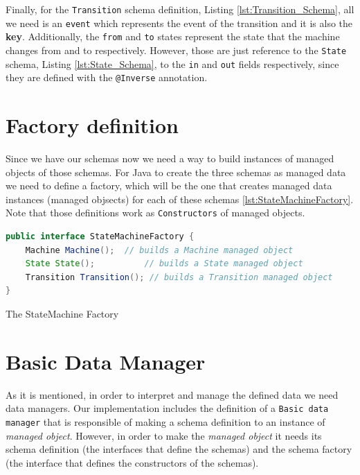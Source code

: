 Finally, for the \texttt{Transition} schema definition, Listing \ref{lst:Transition_Schema}, all we need is an \texttt{event} which represents the event of the transition and it is also the \textbf{key}.
Additionally, the \texttt{from} and \texttt{to} states represent the state that the machine changes from and to respectively.
However, those are just reference to the \texttt{State} schema, Listing \ref{lst:State_Schema}, to the \texttt{in} and \texttt{out} fields respectively, since they are defined with the \texttt{@Inverse} annotation.

\section{Factory definition}
Since we have our schemas now we need a way to build instances of managed objects of those schemas. 
For Java to create the three schemas as managed data we need to define a factory, which will be the one that creates managed data instances (managed objsects) for each of these schemas \ref{lst:StateMachineFactory}.
Note that those definitions work as \texttt{Constructors} of managed objects.

\begin{sourcecode}[H]
	\begin{lstlisting}[language=Java,escapechar=|]
public interface StateMachineFactory {
	Machine Machine();  // builds a Machine managed object
	State State(); 			// builds a State managed object
	Transition Transition(); // builds a Transition managed object
}
	\end{lstlisting}
	\caption{The StateMachine Factory}
	\label{lst:StateMachineFactory}
\end{sourcecode}

\section{Basic Data Manager}
As it is mentioned, in order to interpret and manage the defined data we need data managers. 
Our implementation includes the definition of a \texttt{Basic data manager} that is responsible of making a schema definition to an instance of \textit{managed object}.
However, in order to make the \textit{managed object} it needs its schema definition (the interfaces that define the schemas) and the schema factory (the interface that defines the constructors of the schemas).

